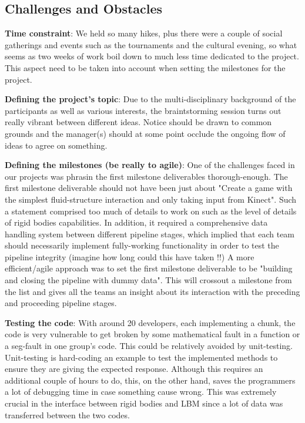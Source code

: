 \subsection{Challenges and Obstacles}
\itemize
\item \textbf{Time constraint}: We held so many hikes, plus there were a couple of social gatherings and events such as the tournaments and the cultural evening, so what seems as two weeks of work boil down to much less time dedicated to the project. This aspect need to be taken into account when setting the milestones for the project.
\item \textbf{Defining the project's topic}: Due to the multi-disciplinary background of the participants as well as various interests, the braintstorming session turns out really vibrant between different ideas. Notice should be drawn to common grounds and the manager(s) should at some point occlude the ongoing flow of ideas to agree on something.
\item \textbf{Defining the milestones (be really to agile)}: One of the challenges faced in our projects was phrasin the first milestone deliverables thorough-enough. The first milestone deliverable should not have been just about "Create a game with the simplest fluid-structure interaction and only taking input from Kinect". Such a statement comprised too much of details to work on such as the level of details of rigid bodies capabilities. In addition, it required a comprehensive data handling system between different pipeline stages, which implied that each team should necessarily implement fully-working functionality in order to test the pipeline integrity (imagine how long could this have taken !!)
A more efficient/agile approach was to set the first milestone deliverable to be "building and closing the pipeline with dummy data". This will crossout a milestone from the list and gives all the teams an insight about its interaction with the preceding and proceeding pipeline stages.
\item \textbf{Testing the code}: With around 20 developers, each implementing a chunk, the code is very vulnerable to get broken by some mathematical fault in a function or a seg-fault in one group's code. This could be relatively avoided by unit-testing. Unit-testing is hard-coding an example to test the implemented methods to ensure they are giving the expected response. Although this requires an additional couple of hours to do, this, on the other hand, saves the programmers a lot of debugging time in case something cause wrong. This was extremely crucial in the interface between rigid bodies and LBM since a lot of data was transferred between the two codes.
